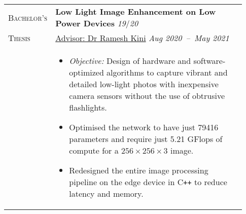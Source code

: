 \documentclass[letterpaper, 10pt, oneside]{article}
\newcommand{\stitle}[1]{\normalsize{\textsc{#1}}}
\newcommand{\bdit}[1]{{\textbf{#1}}}
\begin{document}
\begin{longtable}{@{} p{0.13\linewidth} p{0.8\linewidth}}

    \stitle{Bachelor's}  & \bdit{Low Light Image Enhancement on Low Power Devices} \hfill \textsl{19}/\textsl{20}                                                                                    \\
    \stitle{Thesis}      & \href{https://ece.nitk.ac.in/faculty/ramesh-kini-m}{Advisor: Dr Ramesh Kini} \hfill \textsl{Aug 2020\ --\ May 2021}                                                       \\
                         & \parbox{0.8\textwidth}{                                                                                                                                                   %
        \begin{itemize}[leftmargin=*, itemsep=-0.70ex, topsep=-0.88ex]
            \item \textsl{Objective:} Design of hardware and software-optimized algorithms to capture vibrant and detailed low-light photos with inexpensive camera sensors without the use of obtrusive flashlights.
            \item Optimised the network to have just 79416 parameters and require just 5.21 GFlops of compute for a $256\times 256 \times 3$ image.
            \item Redesigned the entire image processing pipeline on the edge device in C\texttt{++} to reduce latency and memory.
        \end{itemize}
    }
    \\
    \\


\end{longtable}
\end{document}
